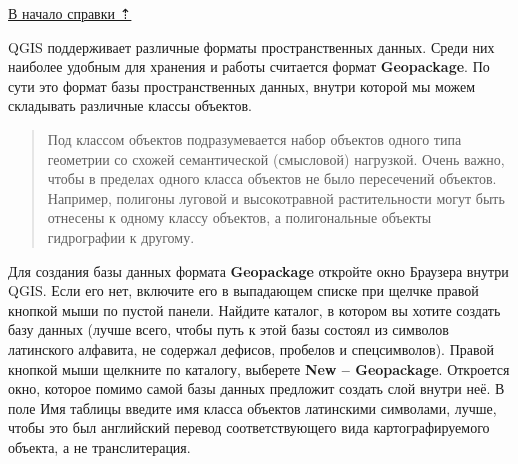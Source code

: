 \documentclass[
  12pt,
]{book}
\begin{document}
\hyperref[practice-topo]{В начало справки ⇡}

QGIS поддерживает различные форматы пространственных данных. Среди них наиболее удобным для хранения и работы считается формат \textbf{Geopackage}. По сути это формат базы пространственных данных, внутри которой мы можем складывать различные классы объектов.

\begin{quote}
Под классом объектов подразумевается набор объектов одного типа геометрии со схожей семантической (смысловой) нагрузкой. Очень важно, чтобы в пределах одного класса объектов не было пересечений объектов. Например, полигоны луговой и высокотравной растительности могут быть отнесены к одному классу объектов, а полигональные объекты гидрографии к другому.
\end{quote}

Для создания базы данных формата \textbf{Geopackage} откройте окно Браузера внутри QGIS. Если его нет, включите его в выпадающем списке при щелчке правой кнопкой мыши по пустой панели. Найдите каталог, в котором вы хотите создать базу данных (лучше всего, чтобы путь к этой базы состоял из символов латинского алфавита, не содержал дефисов, пробелов и спецсимволов). Правой кнопкой мыши щелкните по каталогу, выберете \textbf{New -- Geopackage}. Откроется окно, которое помимо самой базы данных предложит создать слой внутри неё. В поле Имя таблицы введите имя класса объектов латинскими символами, лучше, чтобы это был английский перевод соответствующего вида картографируемого объекта, а не транслитерация.
\end{document}
